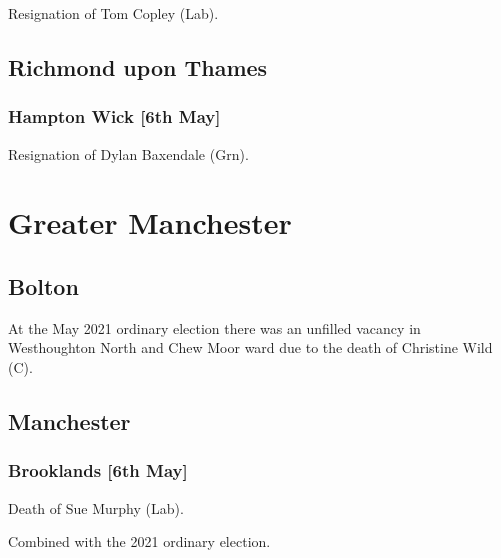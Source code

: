 \documentclass[a4paper,openany]{book}
\begin{document}
\begin{resultsiii}

Resignation of Tom Copley (Lab).

\subsection*{Richmond upon Thames}

\subsubsection*{Hampton Wick \hspace*{\fill}\nolinebreak[1]%
	\enspace\hspace*{\fill}
	[6th May]}


Resignation of Dylan Baxendale (Grn).

\section{Greater Manchester}

\subsection*{Bolton}

At the May 2021 ordinary election there was an unfilled vacancy in Westhoughton North and Chew Moor ward due to the death of Christine Wild (C).

\subsection*{Manchester}

\subsubsection*{Brooklands \hspace*{\fill}\nolinebreak[1]%
	\enspace\hspace*{\fill}
	[6th May]}


Death of Sue Murphy (Lab).

Combined with the 2021 ordinary election.


\end{resultsiii}
\end{document}
